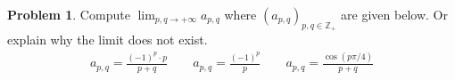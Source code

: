 \documentclass[12pt,b5paper,notitlepage]{article}
\theoremstyle{definition}
\newtheorem{prob}{\color{red}Problem}[section]
\newtheorem{sprob}[prob]{\color{red}$\star$ Problem}
\theoremstyle{plain}
\newcommand{\Zbb}{\mathbb Z}
\newcommand{\Rbb}{\mathbb R}
\newcommand{\fin}{\mathrm{fin}}
\newcommand{\eps}{\varepsilon}
\numberwithin{equation}{section}
\begin{document}
\begin{comment}
\begin{prob}
Prove Thm. \ref{lb129}, namely, prove that every Cauchy net $(x_\alpha)_{\alpha\in I}$ in a complete metric space $X$ is convergent.
\end{prob}


\begin{sprob}\label{lb266}
Let $f:X\rightarrow\Rbb$ be a function. Recall that $\fin(2^X)$ is the set of finite subsets of $X$. For each $A\in\fin(2^X)$, define
\begin{align*}
s_A=\sum_{x\in A}f(x)
\end{align*}
We say that $s\in\Rbb$ is a cluster point of the net $(s_A)_{A\in\fin(2^X)}$ if the following condition holds: 
\begin{itemize}
\item[($\varstar$)] For every $\eps>0$, $s_A$ is frequently in $B_\Rbb(s,\eps)$. (Namely, for every $\eps>0$ and $A\in\fin(2^X)$ there exists $B\in\fin(2^X)$ such that $A\subset B$ and $|s-s_B|<\eps$.) 
\end{itemize}
Answer the following questions.
\begin{enumerate}
\item Prove that if there is a bijection $\varphi:\Zbb_+\rightarrow X$ such that the series $\sum_{n=1}^\infty f\circ\varphi(n)$ converges to $s$, then $s$ is a cluster point of the net $(s_A)_{A\in\fin(2^X)}$.
\item Suppose that $s$ is a cluster point of $(s_A)_{A\in\fin(2^X)}$. Define $(I,\leq)$ to be
\begin{gather*}
I=\big\{(A,\eps)\in\fin(2^X)\times\Rbb_{>0}:|s-s_A|<\eps \big\}\\[0.5ex]
(A,\eps)\leq (A',\eps')\qquad\Longleftrightarrow\qquad A\subset A'\text{ and }\eps\geq\eps'
\end{gather*}
For each $\alpha=(A,\eps)\in I$, let $s_\alpha=s_A$. Prove that $I$ is a directed set. Prove that $(s_\alpha)_{\alpha\in I}$ is a subnet of $(s_A)_{A\in\fin(2^X)}$ if the increasing map $I\rightarrow \fin(2^X)$ is defined to be $(A,\eps)\mapsto A$. Prove that $(s_\alpha)_{\alpha\in I}$ converges to $s$.
\end{enumerate}
\end{sprob}
\end{comment}


\begin{prob}
Compute $\lim_{p,q\rightarrow+\infty}a_{p,q}$ where $(a_{p,q})_{p,q\in\Zbb_+}$ are given below. Or explain why the limit does not exist.
\begin{gather*}
a_{p,q}=\frac{(-1)^p\cdot p}{p+q} \qquad 
a_{p,q}=\frac{(-1)^p}{p}\qquad
a_{p,q}=\frac{\cos(p\pi/4)}{p+q}
\end{gather*}
\end{prob}
\end{document}
